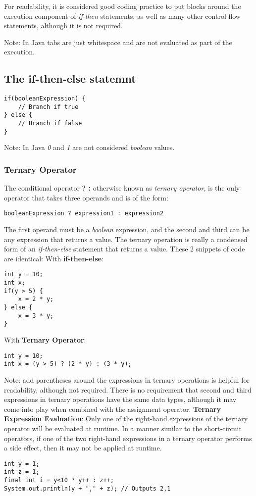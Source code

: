 \documentclass{article}
\begin{document}
For readability, it is considered good coding practice to put blocks around the execution component of \emph{if-then} statements, as well as many other control flow statements, although it is not required.

Note: In Java tabs are just whitespace and are not evaluated as part of the execution.

\subsection{The if-then-else statemnt}

\begin{lstlisting}
if(booleanExpression) {
	// Branch if true
} else {
	// Branch if false
}
\end{lstlisting}

Note: In Java \emph{0} and \emph{1} are not considered \emph{boolean} values.

\subsubsection{Ternary Operator}
The conditional operator \textbf{? :} otherwise known as \emph{ternary operator}, is the only operator that takes three operands and is of the form:
\begin{lstlisting}
booleanExpression ? expression1 : expression2
\end{lstlisting}
The first operand must be a \emph{boolean} expression, and the second and third can be any expression that returns a value.
The ternary operation is really a condensed form of an \emph{if-then-else} statement that returns a value.
These 2 snippets of code are identical:
With \textbf{if-then-else}:
\begin{lstlisting}
int y = 10;
int x;
if(y > 5) {
	x = 2 * y;
} else {
	x = 3 * y;
}
\end{lstlisting}

With \textbf{Ternary Operator}:
\begin{lstlisting}
int y = 10;
int x = (y > 5) ? (2 * y) : (3 * y);
\end{lstlisting}
Note: add parentheses around the expressions in ternary operations is helpful for readability, although not required.
There is no requirement that second and third expressions in ternary operations have the same data types, although it may come into play when combined with the assignment operator.
\textbf{Ternary Expression Evaluation}: Only one of the right-hand expressions of the ternary operator will be evaluated at runtime. In a manner similar to the short-circuit operators, if one of the two right-hand expressions in a ternary operator performs a side effect, then it may not be applied at runtime.
\begin{lstlisting}
int y = 1;
int z = 1;
final int i = y<10 ? y++ : z++;
System.out.println(y + "," + z); // Outputs 2,1
\end{lstlisting}
\end{document}
